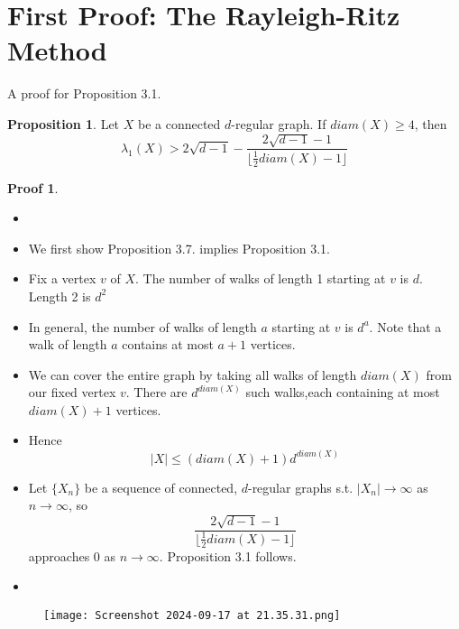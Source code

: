 \documentclass{book}
\theoremstyle{definition}
\newtheorem{proposition}[lemma]{Proposition}
\theoremstyle{remarkstyle}
\newtheorem*{myproof}{Proof}%
\begin{document}
\section{First Proof: The Rayleigh-Ritz Method}
A proof for Proposition 3.1.

\begin{proposition}
    Let $X$ be a connected $d$-regular graph. If $diam(X) \ge 4 $, then $$\lambda_{1}(X) > 2\sqrt{d-1}-\frac{2\sqrt{d-1}-1}{\lfloor \frac{1}{2}diam(X) -1 \rfloor } $$
\end{proposition}
\begin{myproof}
    \begin{itemize}
        \item[] 
        \item We first show Proposition 3.7. implies Proposition 3.1. 
        \item Fix a vertex $v$ of $X$. The number of walks of length 1 starting at $v$ is $d$. Length 2 is $d^{2}$ 
        \item In general, the number of walks of length $a$ starting at $v$ is $d^{a} $. Note that a walk of length $a$ contains at most $a+1$ vertices. 
        \item We can cover the entire graph by taking all walks of length $diam(X)$ from our fixed vertex $v$. There are $d^{diam(X)}$ such walks,each containing at most $diam(X)+1$ vertices. 
        \item Hence $$|X| \le (diam(X)+1)d^{diam(X)} $$
        \item Let $\{X_{n}\} $ be a sequence of connected, $d$-regular graphs s.t. $|X_{n}| \rightarrow \infty $ as $n \rightarrow \infty $, so $$\frac{2\sqrt{d-1}-1}{\lfloor \frac{1}{2}diam(X)-1 \rfloor } $$ approaches 0 as $n \rightarrow \infty $. Proposition 3.1 follows. 
        \item[]
    \end{itemize}
\end{myproof}

\begin{figure}[htbp!]
    \texttt{[image: Screenshot 2024-09-17 at 21.35.31.png]}
    \caption{}
\end{figure}
\end{document}
